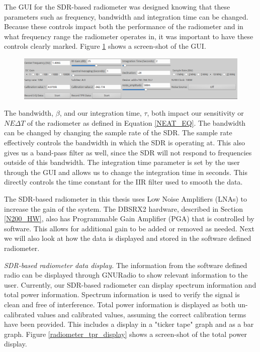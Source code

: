 The GUI for the SDR-based radiometer was designed knowing that these parameters such as frequency, bandwidth and integration time can be changed.  Because these controls impact both the performance of the radiometer and in what frequency range the radiometer operates in, it was important to have these controls clearly marked.  Figure \ref{radiometer_gui} shows a screen-shot of the GUI.

{\begin{figure}[h!tb] 
\centering
\includegraphics[width=16cm]{Images/radiometer_gui.png}
\label{radiometer_gui}
\end{figure}
}

The bandwidth, $\beta$, and our integration time, $\tau$, both impact our sensitivity or $NE\Delta T$ of the radiometer as defined in Equation \ref{NEAT_EQ}.  The bandwidth can be changed by changing the sample rate of the SDR.  The sample rate effectively controls the bandwidth in which the SDR is operating at.  This also gives us a band-pass filter as well, since the SDR will not respond to frequencies outside of this bandwidth.  The integration time parameter is set by the user through the GUI and allows us to change the integration time in seconds.  This directly controls the time constant for the IIR filter used to smooth the data.

The SDR-based radiometer in this thesis uses Low Noise Amplifiers (LNAs) to increase the gain of the system.  The DBSRX2 hardware, described in Section \ref{N200_HW}, also has Programmable Gain Amplifier (PGA) that is controlled by software.  This allows for additional gain to be added or removed as needed.  Next we will also look at how the data is displayed and stored in the software defined radiometer.

\emph{SDR-based radiometer data display.}  The information from the software defined radio can be displayed through GNURadio to show relevant information to the user.  Currently, our SDR-based radiometer can display spectrum information and total power information.  Spectrum information is used to verify the signal is clean and free of interference. Total power information is displayed as both un-calibrated values and calibrated values, assuming the correct calibration terms have been provided.  This includes a display in a "ticker tape" graph and as a bar graph.  Figure \ref{radiometer_tpr_display} shows a screen-shot of the total power display.  

